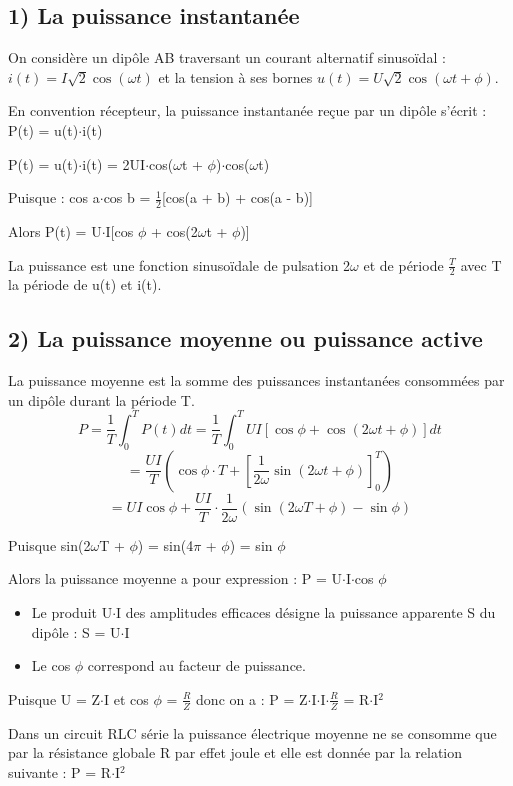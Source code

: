 \documentclass[12pt]{article}
\begin{document}
\subsection*{1) La puissance instantanée}
On considère un dipôle AB traversant un courant alternatif sinusoïdal : $i(t) = I\sqrt{2}\cos(\omega t)$ et la tension à ses bornes $u(t) = U\sqrt{2}\cos(\omega t + \phi)$.

En convention récepteur, la puissance instantanée reçue par un dipôle s'écrit : P(t) = u(t)$\cdot$i(t)

P(t) = u(t)$\cdot$i(t) = 2UI$\cdot$cos($\omega$t + $\phi$)$\cdot$cos($\omega$t)

Puisque : cos a$\cdot$cos b = $\frac{1}{2}$[cos(a + b) + cos(a - b)]

Alors P(t) = U$\cdot$I[cos $\phi$ + cos(2$\omega$t + $\phi$)]

La puissance est une fonction sinusoïdale de pulsation 2$\omega$ et de période $\frac{T}{2}$ avec T la période de u(t) et i(t).

\subsection*{2) La puissance moyenne ou puissance active}
La puissance moyenne est la somme des puissances instantanées consommées par un dipôle durant la période T.
\[ P = \frac{1}{T}\int_0^T P(t)dt = \frac{1}{T}\int_0^T UI[\cos\phi + \cos(2\omega t + \phi)]dt \]
\[ = \frac{UI}{T}(\cos\phi\cdot T + [\frac{1}{2\omega}\sin(2\omega t + \phi)]_0^T) \]
\[ = UI\cos\phi + \frac{UI}{T}\cdot\frac{1}{2\omega}(\sin(2\omega T + \phi) - \sin\phi) \]

Puisque sin(2$\omega$T + $\phi$) = sin(4$\pi$ + $\phi$) = sin $\phi$

Alors la puissance moyenne a pour expression : P = U$\cdot$I$\cdot$cos $\phi$

  \begin{itemize}
\item Le produit U$\cdot$I des amplitudes efficaces désigne la puissance apparente S du dipôle : S = U$\cdot$I
\item Le cos $\phi$ correspond au facteur de puissance.
\end{itemize}

Puisque U = Z$\cdot$I et cos $\phi$ = $\frac{R}{Z}$ donc on a : P = Z$\cdot$I$\cdot$I$\cdot\frac{R}{Z}$ = R$\cdot$I$^2$

Dans un circuit RLC série la puissance électrique moyenne ne se consomme que par la résistance globale R par effet joule et elle est donnée par la relation suivante : P = R$\cdot$I$^2$
\end{document}
